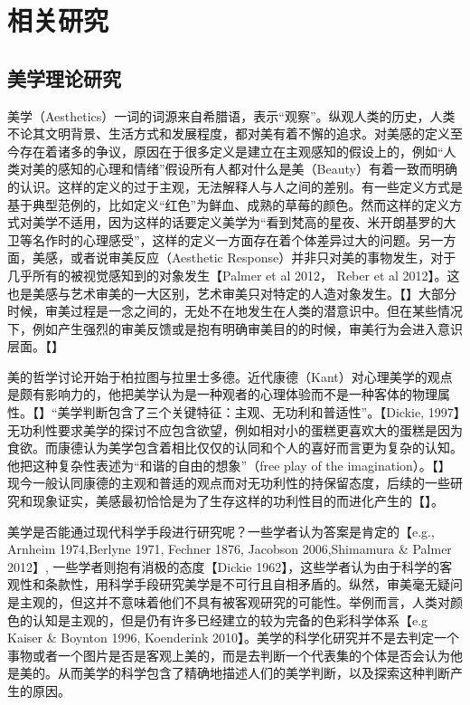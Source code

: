 \chapter{相关研究}
\label{chap:related}

\section{美学理论研究}
美学（Aesthetics）一词的词源来自希腊语，表示“观察”。纵观人类的历史，人类不论其文明背景、生活方式和发展程度，都对美有着不懈的追求。对美感的定义至今存在着诸多的争议，原因在于很多定义是建立在主观感知的假设上的，例如“人类对美的感知的心理和情绪”假设所有人都对什么是美（Beauty）有着一致而明确的认识。这样的定义的过于主观，无法解释人与人之间的差别。有一些定义方式是基于典型范例的，比如定义“红色”为鲜血、成熟的草莓的颜色。然而这样的定义方式对美学不适用，因为这样的话要定义美学为“看到梵高的星夜、米开朗基罗的大卫等名作时的心理感受”，这样的定义一方面存在着个体差异过大的问题。另一方面，美感，或者说审美反应（Aesthetic Response）并非只对美的事物发生，对于几乎所有的被视觉感知到的对象发生【Palmer et al 2012， Reber et al 2012】。这也是美感与艺术审美的一大区别，艺术审美只对特定的人造对象发生。【】大部分时候，审美过程是一念之间的，无处不在地发生在人类的潜意识中。但在某些情况下，例如产生强烈的审美反馈或是抱有明确审美目的的时候，审美行为会进入意识层面。【】

美的哲学讨论开始于柏拉图与拉里士多德。近代康德（Kant）对心理美学的观点是颇有影响力的，他把美学认为是一种观者的心理体验而不是一种客体的物理属性。【】“美学判断包含了三个关键特征：主观、无功利和普适性”。【Dickie, 1997】无功利性要求美学的探讨不应包含欲望，例如相对小的蛋糕更喜欢大的蛋糕是因为食欲。而康德认为美学包含着相比仅仅的认同和个人的喜好而言更为复杂的认知。他把这种复杂性表述为“和谐的自由的想象”（free play of the imagination）。【】现今一般认同康德的主观和普适的观点而对无功利性的持保留态度，后续的一些研究和现象证实，美感最初恰恰是为了生存这样的功利性目的而进化产生的【】。

美学是否能通过现代科学手段进行研究呢？一些学者认为答案是肯定的【e.g., Arnheim 1974,Berlyne 1971, Fechner 1876, Jacobson 2006,Shimamura \& Palmer 2012】, 一些学者则抱有消极的态度【Dickie 1962】，这些学者认为由于科学的客观性和条款性，用科学手段研究美学是不可行且自相矛盾的。纵然，审美毫无疑问是主观的，但这并不意味着他们不具有被客观研究的可能性。举例而言，人类对颜色的认知是主观的，但是仍有许多已经建立的较为完备的色彩科学体系【e.g Kaiser \& Boynton 1996, Koenderink 2010】。美学的科学化研究并不是去判定一个事物或者一个图片是否是客观上美的，而是去判断一个代表集的个体是否会认为他是美的。从而美学的科学包含了精确地描述人们的美学判断，以及探索这种判断产生的原因。

